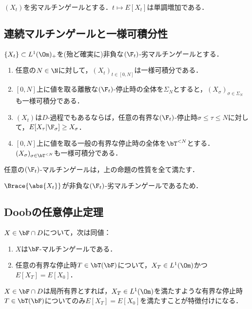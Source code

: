 \documentclass[uplatex,dvipdfmx]{jsreport}
\begin{document}
\begin{proposition}
    $(X_t)$を劣マルチンゲールとする．$t\mapsto E[X_t]$は単調増加である．
\end{proposition}

\subsection{連続マルチンゲールと一様可積分性}

\begin{proposition}[非負な劣マルチンゲールの一様可積分性]
    $\{X_t\}\subset L^1(\Om)_+$を(殆ど確実に)非負な$(\F_t)$-劣マルチンゲールとする．
    \begin{enumerate}
        \item 任意の$N\in\N$に対して，$(X_t)_{t\in[0,N]}$は一様可積分である．
        \item $[0,N]$上に値を取る離散な$(\F_t)$-停止時の全体を$\Sigma_N$とすると，$(X_\sigma)_{\sigma\in\Sigma_N}$も一様可積分である．
        \item $(X_t)$は$D$-過程でもあるならば，任意の有界な$(\F_t)$-停止時$\sigma\le\tau\le N$に対して，$E[X_\tau|\F_\sigma]\ge X_\sigma$．
        \item $[0,N]$上に値を取る一般の有界な停止時の全体を$\bT^{<N}$とする．$(X_\sigma)_{\sigma\in\bT^{<N}}$も一様可積分である．
    \end{enumerate}
\end{proposition}

\begin{corollary}
    任意の$(\F_t)$-マルチンゲールは，上の命題の性質を全て満たす．
\end{corollary}
\begin{Proof}
    $\Brace{\abs{X_t}}$が非負な$(\F_t)$-劣マルチンゲールであるため．
\end{Proof}

\subsection{Doobの任意停止定理}

\begin{proposition}
    $X\in\bF\cap D$について，次は同値：
    \begin{enumerate}
        \item $X$は$\bF$-マルチンゲールである．
        \item 任意の有界な停止時$T\in\bT(\bF)$について，$X_T\in L^1(\Om)$かつ$E[X_T]=E[X_0]$．
    \end{enumerate}
\end{proposition}
\begin{remarks}
    $X\in\bF\cap D$は局所有界とすれば，$X_T\in L^1(\Om)$を満たすような有界な停止時$T\in\bT(\bF)$についてのみ$E[X_T]=E[X_0]$を満たすことが特徴付けになる．
\end{remarks}
\end{document}
